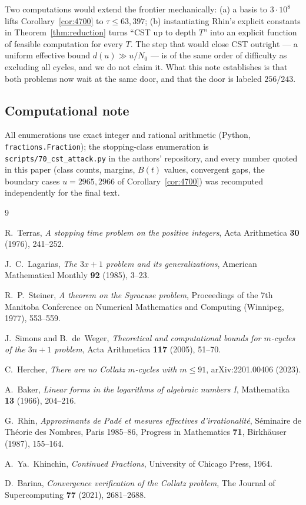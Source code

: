 \documentclass[10pt]{article}
\theoremstyle{definition}
\theoremstyle{remark}
\begin{document}
Two computations would extend the frontier mechanically: (a) a basis to
$3\cdot 10^{8}$ lifts Corollary~\ref{cor:4700} to $\tau \le 63{,}397$; (b)
instantiating Rhin's explicit constants in Theorem~\ref{thm:reduction} turns
``CST up to depth $T$'' into an explicit function of feasible computation for
every $T$. The step that would close CST outright --- a uniform effective
bound $d(u) \gg u/N_0$ --- is of the same order of difficulty as excluding
all cycles, and we do not claim it. What this note establishes is that both
problems now wait at the same door, and that the door is labeled
$256/243$.

\subsection*{Computational note}

All enumerations use exact integer and rational arithmetic (Python,
\texttt{fractions.Fraction}); the stopping-class enumeration is
\texttt{scripts/70\_cst\_attack.py} in the authors' repository, and every
number quoted in this paper (class counts, margins, $B(t)$ values, convergent
gaps, the boundary cases $u = 2965, 2966$ of Corollary~\ref{cor:4700}) was
recomputed independently for the final text.

\begin{thebibliography}{9}

R.~Terras,
\emph{A stopping time problem on the positive integers},
Acta Arithmetica \textbf{30} (1976), 241--252.

J.~C.~Lagarias,
\emph{The $3x+1$ problem and its generalizations},
American Mathematical Monthly \textbf{92} (1985), 3--23.

R.~P.~Steiner,
\emph{A theorem on the Syracuse problem},
Proceedings of the 7th Manitoba Conference on Numerical Mathematics and
Computing (Winnipeg, 1977), 553--559.

J.~Simons and B.~de~Weger,
\emph{Theoretical and computational bounds for $m$-cycles of the $3n+1$
problem},
Acta Arithmetica \textbf{117} (2005), 51--70.

C.~Hercher,
\emph{There are no Collatz $m$-cycles with $m \le 91$},
arXiv:2201.00406 (2023).

A.~Baker,
\emph{Linear forms in the logarithms of algebraic numbers I},
Mathematika \textbf{13} (1966), 204--216.

G.~Rhin,
\emph{Approximants de Pad\'e et mesures effectives d'irrationalit\'e},
S\'eminaire de Th\'eorie des Nombres, Paris 1985--86,
Progress in Mathematics \textbf{71}, Birkh\"auser (1987), 155--164.

A.~Ya.~Khinchin,
\emph{Continued Fractions},
University of Chicago Press, 1964.

D.~Barina,
\emph{Convergence verification of the Collatz problem},
The Journal of Supercomputing \textbf{77} (2021), 2681--2688.

\end{thebibliography}
\end{document}
